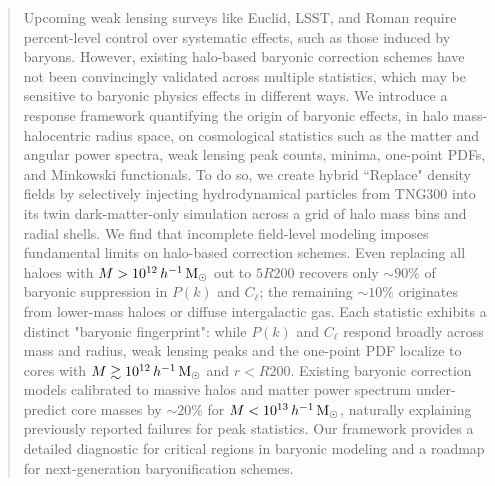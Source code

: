 \documentclass[linenumbers,trackchanges]{aastex701}
\begin{document}
\begin{abstract}
\noindent Upcoming weak lensing surveys like Euclid, LSST, and Roman require percent-level control over systematic effects, such as those induced by baryons. However, existing halo-based baryonic correction schemes have not been convincingly validated across multiple statistics, which may be sensitive to baryonic physics effects in different ways. We introduce a response framework quantifying the origin of baryonic effects, in halo mass-halocentric radius space, on cosmological statistics such as the matter and angular power spectra, weak lensing peak counts, minima, one-point PDFs, and Minkowski functionals. To do so, we create hybrid ``Replace" density fields by selectively injecting hydrodynamical particles from TNG300 into its twin dark-matter-only simulation across a grid of halo mass bins and radial shells. We find that incomplete field-level modeling imposes fundamental limits on halo-based correction schemes. Even replacing all haloes with $M>10^{12}\,h^{-1}\,{\rm M}_\odot$ out to $5R{200}$ recovers only $\sim 90\%$ of baryonic suppression in $P(k)$ and $C_\ell$; the remaining $\sim 10\%$ originates from lower-mass haloes or diffuse intergalactic gas. Each statistic exhibits a distinct "baryonic fingerprint": while $P(k)$ and $C_\ell$ respond broadly across mass and radius, weak lensing peaks and the one-point PDF localize to cores with $M\gtrsim 10^{12}\,h^{-1}\,{\rm M}_\odot$ and $r<R{200}$. Existing baryonic correction models calibrated to massive halos and matter power spectrum under-predict core masses by $\sim 20\%$ for $M<10^{13}\,h^{-1}\,{\rm M}_\odot$, naturally explaining previously reported failures for peak statistics. Our framework provides a detailed diagnostic for critical regions in baryonic modeling and a roadmap for next-generation baryonification schemes.
\end{abstract}



\end{document}
